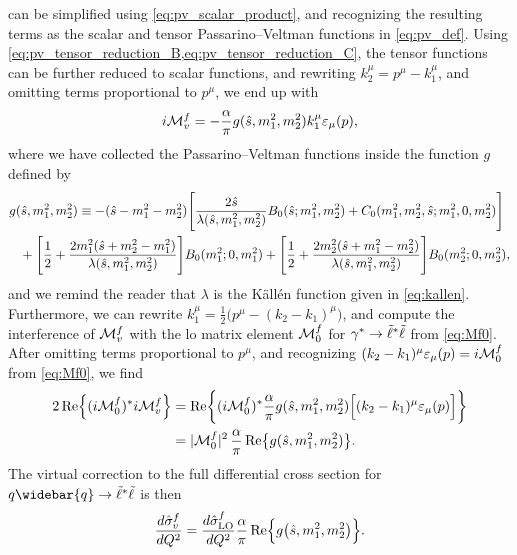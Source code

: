  can be simplified using \cref{eq:pv_scalar_product}, and recognizing the resulting terms as the scalar and tensor Passarino--Veltman functions in \cref{eq:pv_def}.
Using \cref{eq:pv_tensor_reduction_B,eq:pv_tensor_reduction_C}, the tensor functions can be further reduced to scalar functions, and rewriting $k_2^\mu=p^\mu-k_1^\mu$, and omitting terms proportional to $p^\mu$, we end up with
\begin{equation}
    i\mathcal{M}^f_v = -
    \frac{\alpha}{\pi} g(\hat{s},m_1^2,m_2^2) k_1^\mu \varepsilon_\mu(p),
\end{equation}
where we have collected the Passarino--Veltman functions inside the function $g$ defined by
\begin{equation}
\begin{split}
    g(\shat,m_1^2,m_2^2) &\equiv
    - (\shat-m_1^2-m_2^2) \Biggl[
        \frac{2\shat}{\lambda(\shat,m_1^2,m_2^2)} B_0(\shat;m_1^2,m_2^2)
        +C_0(m_1^2,m_2^2,\shat;m_1^2,0,m_2^2)
    \Biggr]
    \\ &\hspace{-4.5em}
    +\Biggl[
        \frac{1}{2}
        + \frac{2m_1^2(\shat+m_2^2-m_1^2)}{\lambda(\shat,m_1^2,m_2^2)} 
    \Biggr] B_0(m_1^2;0,m_1^2)
    + \Biggl[
        \frac{1}{2}
        + \frac{2m_2^2(\shat+m_1^2-m_2^2)}{\lambda(\shat,m_1^2,m_2^2)} 
    \Biggr] B_0(m_2^2;0,m_2^2),
\end{split}
\end{equation}
and we remind the reader that $\lambda$ is the K\"all\'en function given in \cref{eq:kallen}.
Furthermore, we can rewrite $k_1^\mu = \frac{1}{2}\bigl(p^\mu - (k_2-k_1)^\mu\bigr)$, and compute the interference of $\mathcal{M}^f_v$ with the \gls{lo} matrix element $\mathcal{M}^f_0$ for $\gamma^*\to{\tilde{\ell}}^*{\tilde{\ell}}$ from \cref{eq:Mf0}. After omitting terms proportional to $p^\mu$, and recognizing $(k_2-k_1)^\mu\varepsilon_\mu(p)=i\mathcal{M}_0^f$ from \cref{eq:Mf0}, we find
\begin{align}
    2\operatorname{Re}\Bigl\{(i\mathcal{M}_0^f)^* i\mathcal{M}^f_v\Bigr\} &=
    \operatorname{Re}\biggl\{ (i\mathcal{M}_0^f)^* \frac{\alpha}{\pi} g(\hat{s},m_1^2,m_2^2)
    \Bigl[(k_2-k_1)^\mu \varepsilon_\mu(p) \Bigr] \biggr\}
    \nonumber \\
    &= \lvert\mathcal{M}^f_0\rvert^2 \, \frac{\alpha}{\pi}
    \operatorname{Re}\bigl\{g(\hat{s},m_1^2,m_2^2)\bigr\}.
\end{align}
The virtual correction to the full differential cross section for $q\widebar{q}\to\slepton^*\slepton$ is then
\begin{equation}
    \frac{d\hat\sigma^f_v}{dQ^2} = \frac{d\hat\sigma^f_{\mathrm{LO}}}{dQ^2} \frac{\alpha}{\pi}
    \operatorname{Re} \Bigl\{ g \bigl(\hat{s},m_1^2,m_2^2 \bigr) \Bigr\}.
\end{equation}

